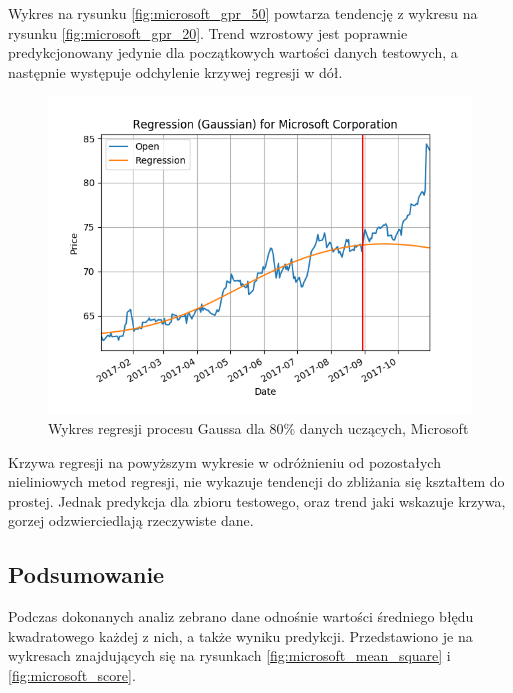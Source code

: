 Wykres na rysunku \ref{fig:microsoft_gpr_50} powtarza tendencję z wykresu na rysunku \ref{fig:microsoft_gpr_20}.
Trend wzrostowy jest poprawnie predykcjonowany jedynie dla początkowych wartości danych testowych, a następnie występuje odchylenie krzywej regresji w dół.\\

\begin{figure}[h!]
\centering
\includegraphics[width=150mm]{pictures/plots/microsoft_gpr_80.png}
\caption{Wykres regresji procesu Gaussa dla 80\% danych uczących, Microsoft}
\label{fig:microsoft_gpr_80}
\end{figure}

Krzywa regresji na powyższym wykresie w odróżnieniu od pozostałych nieliniowych metod regresji, nie wykazuje tendencji do zbliżania się kształtem do prostej.
Jednak predykcja dla zbioru testowego, oraz trend jaki wskazuje krzywa, gorzej odzwierciedlają rzeczywiste dane.\\

\subsection{Podsumowanie}

Podczas dokonanych analiz zebrano dane odnośnie wartości średniego błędu kwadratowego każdej z nich, a także wyniku predykcji. Przedstawiono je na wykresach znajdujących się na rysunkach \ref{fig:microsoft_mean_square} i \ref{fig:microsoft_score}.\\


